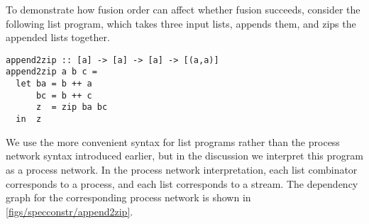 

To demonstrate how fusion order can affect whether fusion succeeds, consider the following list program, which takes three input lists, appends them, and zips the appended lists together.

\begin{lstlisting}
append2zip :: [a] -> [a] -> [a] -> [(a,a)]
append2zip a b c =
  let ba = b ++ a
      bc = b ++ c
      z  = zip ba bc
  in  z
\end{lstlisting}

We use the more convenient syntax for list programs rather than the process network syntax introduced earlier, but in the discussion we interpret this program as a process network.
In the process network interpretation, each list combinator corresponds to a process, and each list corresponds to a stream.
The dependency graph for the corresponding process network is shown in \cref{figs/specconstr/append2zip}.



